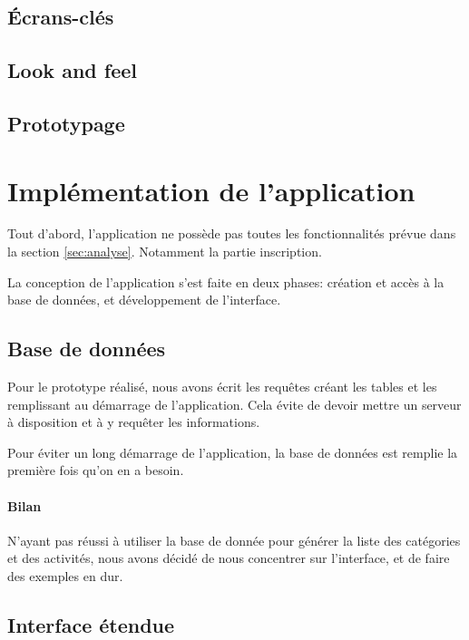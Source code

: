 \documentclass{article}
\begin{document}
	\subsection{Écrans-clés}



	\subsection{Look and feel}



	\subsection{Prototypage}

\section{Implémentation de l'application}

    Tout d'abord, l'application ne possède pas toutes les fonctionnalités prévue
    dans la section \ref{sec:analyse}. Notamment la partie inscription.


    La conception de l'application s'est faite en deux phases: création et accès
    à la base de données, et développement de l'interface.

    \subsection{Base de données}

        Pour le prototype réalisé, nous avons écrit les requêtes créant les
        tables et les remplissant au démarrage de l'application. Cela évite de
        devoir mettre un serveur à disposition et à y requêter les informations.

        Pour éviter un long démarrage de l'application, la base de données est
        remplie la première fois qu'on en a besoin.

        \paragraph{Bilan} N'ayant pas réussi à utiliser la base de donnée pour
        générer la liste des catégories et des activités, nous avons décidé de
        nous concentrer sur l'interface, et de faire des exemples en dur.


    \subsection{Interface étendue}
\end{document}
